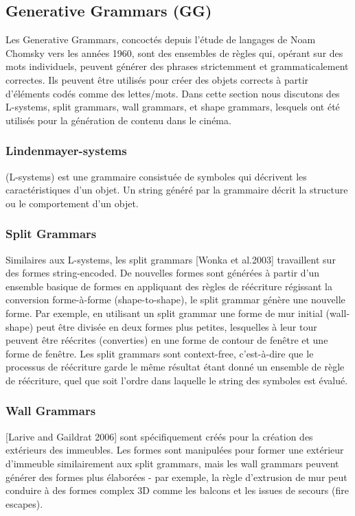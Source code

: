 \documentclass[11pt]{report}
\begin{document}
\subsection{Generative Grammars (GG)}

Les Generative Grammars, concoctés depuis l'étude de langages de Noam Chomsky vers les années 1960, sont des ensembles de règles qui, opérant sur des mots individuels, peuvent générer des phrases strictemment et grammaticalement correctes. Ils peuvent être utilisés pour créer des objets corrects à partir d'éléments codés comme des lettes/mots. Dans cette section nous discutons des L-systems, split grammars, wall grammars, et shape grammars, lesquels ont été utilisés pour la génération de contenu dans le cinéma.

\subsubsection{Lindenmayer-systems} (L-systems) est une grammaire consistuée de symboles qui décrivent les caractéristiques d'un objet. Un string généré par la grammaire décrit la structure ou le comportement d'un objet.

\subsubsection{Split Grammars} Similaires aux L-systems, les split grammars [Wonka et al.2003] travaillent sur des formes string-encoded. De nouvelles formes sont générées à partir d'un ensemble basique de formes en appliquant des règles de réécriture régissant la conversion forme-à-forme (shape-to-shape), le split grammar génère une nouvelle forme. Par exemple, en utilisant un split grammar une forme de mur initial (wall-shape) peut être divisée en deux formes plus petites, lesquelles à leur tour peuvent être réécrites (converties) en une forme de contour de fenêtre et une forme de fenêtre. Les split grammars sont context-free, c'est-à-dire que le processus de réécriture garde le même résultat étant donné un ensemble de règle de réécriture, quel que soit l'ordre dans laquelle le string des symboles est évalué.

\subsubsection{Wall Grammars} [Larive and Gaildrat 2006]  sont spécifiquement créés pour la création des extérieurs des immeubles. Les formes sont manipulées pour former une extérieur d'immeuble similairement aux split grammars, mais les wall grammars peuvent générer des formes plus élaborées - par exemple, la règle d'extrusion de mur peut conduire à des formes complex 3D comme les balcons et les issues de secours (fire escapes).
\end{document}
